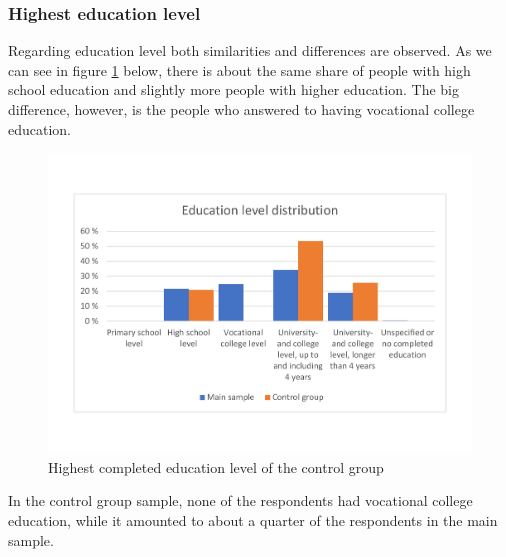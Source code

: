 \subsubsection{Highest education level}
Regarding education level both similarities and differences are observed. As we can see in figure \ref{fig:education_controlgroup} below, there is about the same share of people with high school education and slightly more people with higher education. The big difference, however, is the people who answered to having vocational college education. 
\begin{figure}[!h]
    \centering
    \includegraphics[scale=0.40]{figures/diagrams/education_controlgroup.pdf}
    \caption{Highest completed education level of the control group}
    \label{fig:education_controlgroup}
\end{figure}
In the control group sample, none of the respondents had vocational college education, while it amounted to about a quarter of the respondents in the main sample. 

